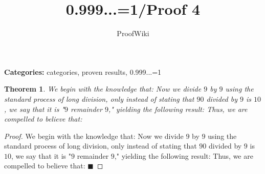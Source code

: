 \documentclass{article}
\title{0.999...=1/Proof 4}
\author{ProofWiki}
\date{}
\newtheorem{theorem}{Theorem}
\begin{document}
\maketitle

\noindent\textbf{Categories:} categories, proven results, 0.999...=1

\begin{theorem}
We begin with the knowledge that: Now we divide $9$ by $9$ using the standard process of long division, only instead of stating that $90$ divided by $9$ is $10$, we say that it is "$9$ remainder $9$," yielding the following result: Thus, we are compelled to believe that:
\end{theorem}

\begin{proof}
We begin with the knowledge that: Now we divide $9$ by $9$ using the standard process of long division, only instead of stating that $90$ divided by $9$ is $10$, we say that it is "$9$ remainder $9$," yielding the following result: Thus, we are compelled to believe that: $\blacksquare$
\end{proof}
\end{document}
